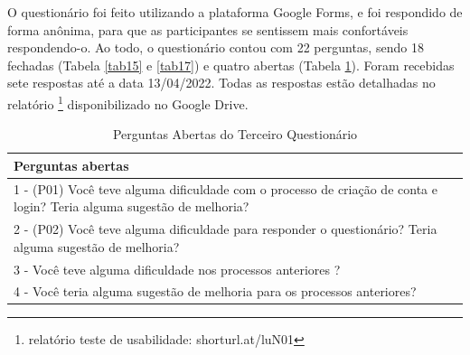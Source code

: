 O questionário foi feito utilizando a plataforma Google Forms, 
e foi respondido de forma anônima, para que as
participantes se sentissem mais confortáveis respondendo-o. Ao todo, o questionário contou com 22 perguntas, sendo 18 fechadas 
(Tabela \ref{tab15} e \ref{tab17}) e 
quatro abertas (Tabela \ref{tab16}). Foram recebidas sete respostas até a data 13/04/2022. Todas as respostas estão 
detalhadas no relatório \footnote{relatório teste de usabilidade: shorturl.at/luN01 } disponibilizado no Google Drive.

\begin{table}[htbp]
    \centering
    \caption{Perguntas Abertas do Terceiro Questionário}
    \label{tab16}
    \begin{tabular}{p{15cm}}
        \toprule
        \textbf{Perguntas abertas} \\
        \midrule     
        1 - (P01) Você teve alguma dificuldade com o processo de criação de conta e login? Teria alguma sugestão de melhoria? \\
        \midrule
        2 - (P02) Você teve alguma dificuldade para responder o questionário? Teria alguma sugestão de melhoria?\\
        \midrule
        3 - Você teve alguma dificuldade nos processos anteriores ?  \\
        \midrule
        4 - Você teria alguma sugestão de melhoria para os processos anteriores? \\
        \bottomrule
    \end{tabular} 
\end{table}

